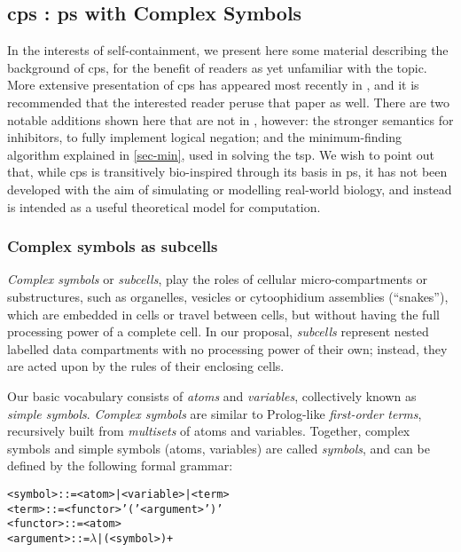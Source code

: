 \subsection{\label{sec:tsp:cpsystems}\texorpdfstring{\gls{cps}}{cP systems} : \texorpdfstring{\gls{ps}}{P systems} with Complex Symbols}

In the interests of self-containment, we present here some material describing the background of \gls{cps}, for the benefit of readers as yet unfamiliar with the topic.  More extensive presentation of \gls{cps} has appeared most recently in \cite{Nicolescu2018}, and it is recommended that the interested reader peruse that paper as well.  There are two notable additions shown here that are not in \cite{Nicolescu2018}, however: the stronger semantics for inhibitors, to fully implement logical negation; and the minimum-finding algorithm explained in \autoref{sec-min}, used in solving the \gls{tsp}.  We wish to point out that, while \gls{cps} is transitively bio-inspired through its basis in \gls{ps}, it has not been developed with the aim of simulating or modelling real-world biology, and instead is intended as a useful theoretical model for computation.

\subsubsection{Complex symbols as subcells}

\emph{Complex symbols} or \emph{subcells}, 
play the roles of cellular micro-compartments or substructures,
such as organelles, vesicles or cytoophidium assemblies (``snakes''),
which are embedded in cells or travel between cells, 
but without having the full processing power of a complete cell.
In our proposal, \emph{subcells} represent nested labelled data compartments
with no processing power of their own;
instead, they are acted upon by the rules of their enclosing cells.

Our basic vocabulary consists of \emph{atoms} and \emph{variables}, 
collectively known as \emph{simple symbols}.
\emph{Complex symbols} are similar to Prolog-like \emph{first-order terms}, 
recursively built from \emph{multisets} of atoms and variables.
Together, complex symbols and simple symbols (atoms, variables) are called \emph{symbols},
and can be defined by the following formal grammar:

\begin{framed}
\vspace{-0.5cm}
\begin{small}
\begin{alltt}
    <symbol> ::= <atom> | <variable> | <term> 
    <term> ::= <functor> '(' <argument> ')'
    <functor> ::= <atom>
    <argument> ::= \(\lambda\) | ( <symbol> )+
\end{alltt}
\end{small}
\vspace{-0.5cm}
\end{framed}

